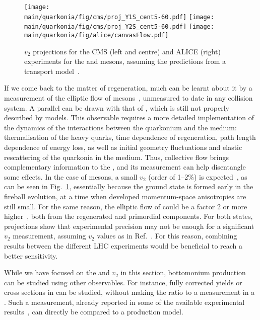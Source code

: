 \documentclass[../report.tex]{subfiles}
\providecommand{\main}{..}
\begin{document}
\begin{figure}
\begin{center}
 \texttt{[image: \\main/quarkonia/fig/cms/proj\_Y1S\_cent5-60.pdf]}
 \texttt{[image: \\main/quarkonia/fig/cms/proj\_Y2S\_cent5-60.pdf]}
 \texttt{[image: \\main/quarkonia/fig/alice/canvasFlow.pdf]}
\end{center}

 \caption{$v_2$ projections for the CMS (left and centre) and ALICE (right) experiments for the  and  mesons, assuming the predictions from a transport model~\cite{Du:2017qkv}.}
 \label{fig:upsi_v2}
\end{figure}

If we come back to the matter of regeneration, much can be learnt about it by a measurement of the elliptic flow of  mesons~\cite{Das:2018xel}, 
unmeasured to date in any collision system. 
A parallel can be
drawn with that of \PJgy, which is still not properly described by models. This observable requires a more detailed implementation of the dynamics of the interactions between the 
quarkonium and the medium: thermalisation of the heavy quarks, time dependence of regeneration, path length dependence of energy loss, as well as initial geometry fluctuations and 
elastic rescattering of the quarkonia in the medium. Thus, collective flow brings complementary information to the \raa, and its measurement can help disentangle some
effects. In the case of  mesons, a small $v_2$ (order of 1--2\%) is expected~\cite{Du:2017qkv,Yao:2018zrg,Bhaduri:2018iwr}, as can be seen in Fig.~\ref{fig:upsi_v2},
essentially because the ground state is formed early in the fireball evolution, at a time when 
developed momentum-space anisotropies are still small. For the same reason, the elliptic flow of  could be a factor 2 or more higher~\cite{Du:2017qkv,Bhaduri:2018iwr}, both from the regenerated and primordial
components. For both states, projections show that experimental precision may not be enough for a significant $v_2$ measurement, assuming $v_2$ values as in Ref.~\cite{Du:2017qkv}. For this reason,
combining results between the different LHC experiments would be beneficial to reach a better sensitivity.

While we have focused on the \raa and $v_2$ in this section, bottomonium production can be studied using other observables. For instance, fully corrected yields or cross sections
in \PbPb can be studied, without making the ratio to a \pp measurement in a \raa. Such a measurement, already reported in some of the available experimental results~\cite{Sirunyan:2018nsz},
can directly be compared to a production model. 
\end{document}
